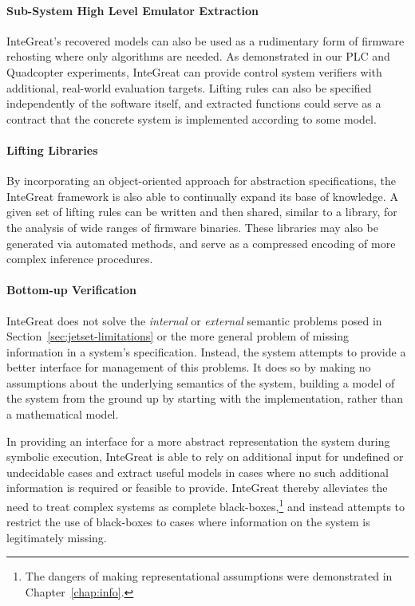 \paragraph{Sub-System High Level Emulator Extraction}
InteGreat's recovered models can also be used as a rudimentary form of firmware rehosting where only algorithms are needed.
As demonstrated in our PLC and Quadcopter experiments, InteGreat can provide control system verifiers with additional, real-world evaluation targets.
Lifting rules can also be specified independently of the software itself, and extracted functions could serve as a contract that the concrete system is implemented according to some model.

\paragraph{Lifting Libraries}
By incorporating an object-oriented approach for abstraction specifications, the InteGreat framework is also able to continually expand its base of knowledge.
A given set of lifting rules can be written and then shared, similar to a library, for the analysis of wide ranges of firmware binaries.
These libraries may also be generated via automated methods, and serve as a compressed encoding of more complex inference procedures.

\paragraph{Bottom-up Verification}
InteGreat does not solve the \emph{internal} or \emph{external} semantic problems posed in Section~\ref{sec:jetset-limitations} or the more general problem of missing information in a system's specification.
Instead, the system attempts to provide a better interface for management of this problems.
It does so by making no assumptions about the underlying semantics of the system, building a model of the system from the ground up by starting with the implementation, rather than a mathematical model.

In providing an interface for a more abstract representation the system during symbolic execution, InteGreat is able to rely on additional input for undefined or undecidable cases and extract useful models in cases where no such additional information is required or feasible to provide.
InteGreat thereby alleviates the need to treat complex systems as complete black-boxes,\footnote{The dangers of making representational assumptions were demonstrated in Chapter~\ref{chap:info}.} and instead attempts to restrict the use of black-boxes to cases where information on the system is legitimately missing.
